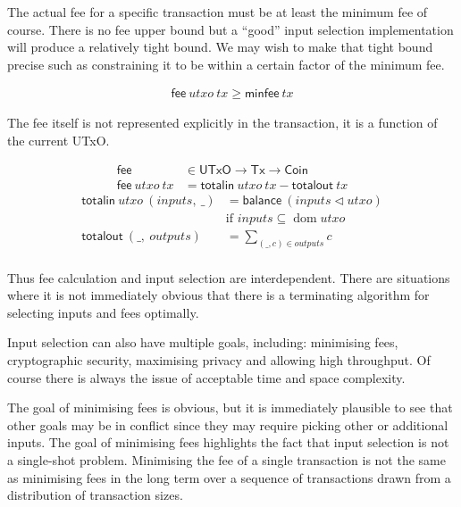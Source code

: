 \documentclass{article}
\DeclareMathOperator{\dom}{dom}
\newcommand{\restrictdom}{\lhd}
\begin{document}
The actual fee for a specific transaction must be at least the minimum fee of
course. There is no fee upper bound but a ``good'' input selection
implementation will produce a relatively tight bound. We may wish to make that
tight bound precise such as constraining it to be within a certain factor of
the minimum fee.

\begin{equation}
\begin{split}
\mathsf{fee} ~ utxo ~ tx \geq \mathsf{minfee} ~ tx
\end{split}
\end{equation}

The fee itself is not represented explicitly in the transaction, it is a
function of the current UTxO.

\begin{equation}
\begin{split}
\mathsf{fee} & \in \mathsf{UTxO} \to \mathsf{Tx} \to \mathsf{Coin} \\
\mathsf{fee} ~ utxo ~ tx & = \mathsf{totalin} ~ utxo ~ tx - \mathsf{totalout} ~ tx
\end{split}
\end{equation}
%
\begin{equation}
\begin{split}
\mathsf{totalin} ~ utxo ~ (inputs, ~ \_) & = \mathsf{balance} ~ (inputs \restrictdom utxo) \\
                 & \text{if } inputs \subseteq \dom utxo \\
\mathsf{totalout} ~ (\_, ~ outputs) & = \sum_{(\_, c) \in outputs} c \\
\end{split}
\end{equation}

Thus fee calculation and input selection are interdependent. There are
situations where it is not immediately obvious that there is a terminating
algorithm for selecting inputs and fees optimally.

Input selection can also have multiple goals, including: minimising fees,
cryptographic security, maximising privacy and allowing high throughput. Of
course there is always the issue of acceptable time and space complexity.

The goal of minimising fees is obvious, but it is immediately plausible to see
that other goals may be in conflict since they may require picking other or
additional inputs. The goal of minimising fees highlights the fact that input
selection is not a single-shot problem. Minimising the fee of a single
transaction is not the same as minimising fees in the long term over a
sequence of transactions drawn from a distribution of transaction sizes.
\end{document}
